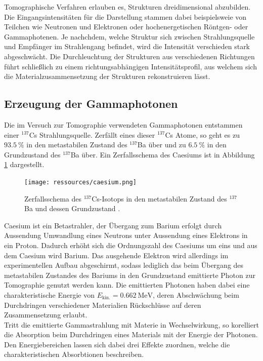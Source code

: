 \noindent Tomographische Verfahren erlauben es, Strukturen dreidimensional abzubilden.
Die Eingangsintensitäten für die Darstellung stammen dabei beispielsweie von
Teilchen wie Neutronen und Elektronen oder hochenergetischen Röntgen- oder
Gammaphotenen. Je nachchdem, welche Struktur sich zwischen Strahlungsquelle und
Empfänger im Strahlengang befindet, wird die Intensität verschieden stark
abgeschwächt. Die Durchleuchtung der Strukturen aus verschiedenen Richtungen
führt schließlich zu einem richtungsabhängigen Intensitätsprofil, aus welchem
sich die Materialzusammensetzung der Strukturen rekonstruieren lässt. \\
\subsection{Erzeugung der Gammaphotonen}
\noindent Die im Versuch zur Tomographie verwendeten Gammaphotonen entstammen
einer $^{137}$Cs Strahlungsquelle. Zerfällt eines dieser $^{137}$Cs Atome, so
geht es zu $\SI{93.5}{\percent}$ in den metastabilen Zustand des $^{137}$Ba
über und zu $\SI{6.5}{\percent}$ in den Grundzustand des $^{137}$Ba über. Ein
Zerfallsschema des Caesiums ist in Abbildung \ref{fig:01} dargestellt.
\begin{figure}
  \centering
  \texttt{[image: ressources/caesium.png]}
  \caption{Zerfallsschema des $^{137}$Cs-Isotops in den metastabilen Zustand des
  $^{137}$Ba und dessen Grundzustand \cite{gil}.}
  \label{fig:01}
\end{figure}
\noindent Caesium ist ein Betastrahler, der Übergang zum Barium erfolgt durch
Aussendung Umwandlung eines Neutrons unter Aussendung eines Elektrons in ein
Proton. Dadurch erhöht sich die Ordnungszahl des Caesiums um eins und aus dem
Caesium wird Barium. Das ausgehende Elektron wird allerdings im experimentellen
Aufbau abgeschirmt, sodass lediglich das beim Übergang des metastabilen Zustandes
des Bariums in den Grundzustand emittierte Photon zur Tomographie genutzt werden
kann. Die emittierten Photonen haben dabei eine charakteristische Energie von
$E_\text{kin.} = \SI{0.662}{\mega\electronvolt}$, deren Abschwächung beim
Durchdringen verschiedener Materialien Rückschlüsse auf deren Zusammensetzung
erlaubt. \\
\noindent Tritt die emittierte Gammastrahlung mit Materie in Wechselwirkung, so
korelliert die Absorption beim Durchdringen eines Materials mit der Energie der
Photonen. Den Energiebereichen lassen sich dabei drei Effekte zuordnen, welche
die charakteristischen Absorbtionen beschreiben. \\
